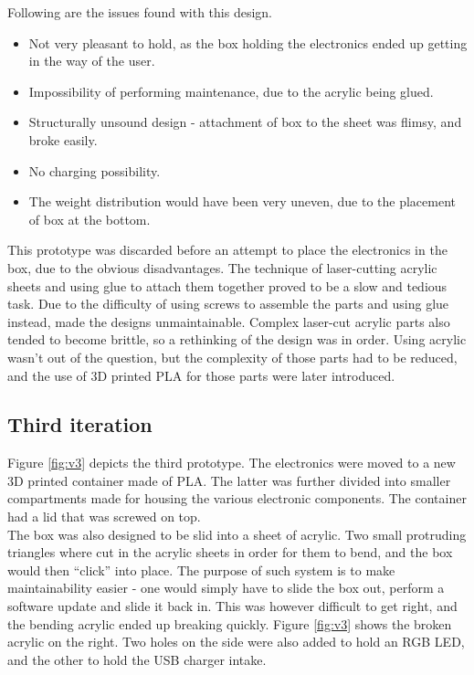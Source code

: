 Following are the issues found with this design.

\begin{itemize} \itemsep0em
	\item Not very pleasant to hold, as the box holding the electronics ended up getting in the way of the user.
	\item Impossibility of performing maintenance, due to the acrylic being glued.
	\item Structurally unsound design - attachment of box to the sheet was flimsy, and broke easily.
	\item No charging possibility.
	\item The weight distribution would have been very uneven, due to the placement of box at the bottom.
\end{itemize}

This prototype was discarded before an attempt to place the electronics in the box, due to the obvious disadvantages. The technique of laser-cutting acrylic sheets and using glue to attach them together proved to be a slow and tedious task. Due to the difficulty of using screws to assemble the parts and using glue instead, made the designs unmaintainable. Complex laser-cut acrylic parts also tended to become brittle, so a rethinking of the design was in order. Using acrylic wasn't out of the question, but the complexity of those parts had to be reduced, and the use of 3D printed PLA for those parts were later introduced. \\


\subsection{Third iteration}

Figure \ref{fig:v3} depicts the third prototype. The electronics were moved to a new 3D printed container made of PLA. The latter was further divided into smaller compartments made for housing the various electronic components. The container had a lid that was screwed on top. \\
The box was also designed to be slid into a sheet of acrylic. Two small protruding triangles where cut in the acrylic sheets in order for them to bend, and the box would then ``click'' into place. The purpose of such system is to make maintainability easier - one would simply have to slide the box out, perform a software update and slide it back in. This was however difficult to get right, and the bending acrylic ended up breaking quickly. Figure \ref{fig:v3} shows the broken acrylic on the right. Two holes on the side were also added to hold an RGB LED, and the other to hold the USB charger intake.

